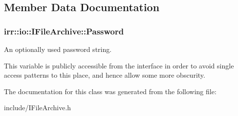 \subsection{Member Data Documentation}
\subsubsection[{\texorpdfstring{Password}{Password}}]{ irr\+::io\+::\+I\+File\+Archive\+::\+Password}\hypertarget{classirr_1_1io_1_1IFileArchive_ae5b574864226b09c70518e163e59b6ba}{}\label{classirr_1_1io_1_1IFileArchive_ae5b574864226b09c70518e163e59b6ba}


An optionally used password string. 

This variable is publicly accessible from the interface in order to avoid single access patterns to this place, and hence allow some more obscurity. 

The documentation for this class was generated from the following file\+:\begin{DoxyCompactItemize}
\item 
include/I\+File\+Archive.\+h\end{DoxyCompactItemize}
